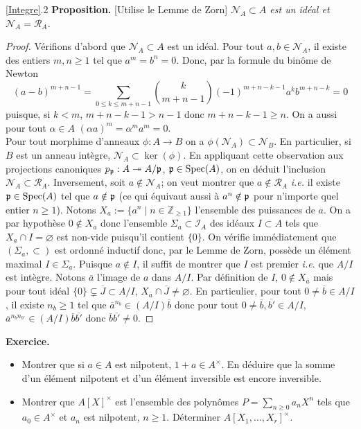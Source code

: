\documentclass[a4paper, oneside, 12pt]{book}
\theoremstyle{theoremeStyle} %
\theoremstyle{definition} %
\newcommand{\ie}{\textit{i.e.}} %
\DeclareMathOperator{\Spec}{Spec}
\newcommand{\Z}{\mathbb{Z}}
\begin{document}
  \ref{Integre}.2 \textbf{Proposition.}  [Utilise le Lemme de Zorn]  \textit{$\mathcal{N}_A\subset A$ est un idéal et $\mathcal{N}_A=\mathcal{R}_A$.}

\begin{proof} Vérifions d'abord que $\mathcal{N}_A\subset A$ est un idéal. Pour tout $a,b \in \mathcal{N}_A$, il existe des entiers $m,n\geq 1$ tel que $a^m=b^n=0$. Donc, par la formule du binôme de Newton $$(a-b)^{m+n-1}=\sum_{0\leq k\leq m+n-1}\binom{k}{m+n-1}(-1)^{m+n-k-1}a^kb^{m+n-k}=0$$
puisque, si $k<m$, $m+n-k-1>n-1$ donc $m+n-k-1\geq n$.  On a aussi pour tout $\alpha\in A$ $(\alpha a)^m=\alpha^m a^m=0$.\\
\indent Pour tout morphime d'anneaux $\phi:A\rightarrow B$ on a $\phi(\mathcal{N}_A)\subset \mathcal{N}_B$. En particulier, si $B$ est un anneau intègre, $\mathcal{N}_A\subset \ker(\phi)$. En appliquant cette observation aux projections canoniques $p_\frak{p}:A\twoheadrightarrow A/\frak{p}$, $\frak{p}\in \Spec(A)$, on en déduit l'inclusion $\mathcal{N}_A\subset \mathcal{R}_A$. Inversement, soit $a\notin \mathcal{N}_A$; on veut montrer que $a\notin \mathcal{R}_A$ \ie{} il existe $\frak{p}\in \Spec(A)$ tel que $a\notin\frak{p}$ (ce qui équivaut aussi à $a^n\notin \frak{p}$ pour n'importe quel entier $n\geq 1$). Notons $X_a:=\lbrace a^n\;|\; n\in \Z_{\geq 1}\rbrace $ l'ensemble des puissances de $a$. On a par hypothèse $0\notin X_a$ donc l'ensemble $\Sigma_a\subset \mathcal{I}_A$ des idéaux $I\subset A$ tels que $X_a\cap I=\varnothing$ est non-vide puisqu'il contient $\lbrace 0\rbrace$. On vérifie immédiatement que $(\Sigma_a,\subset)$ est ordonné inductif donc, par le Lemme de Zorn, possède un élément maximal $I\in \Sigma_a$. Puisque  $a\notin I$, il suffit de montrer que $I$ est premier \ie{} que $A/I$ est intègre. Notons $\overline{a}$  l'image de $a$ dans $A/I$. Par définition de $I$, $0\notin X_{\overline{a}}$ mais  pour tout idéal $\lbrace 0\rbrace\subsetneq \overline{J}\subset A/I$, $X_{\overline{a}}\cap \overline{J}\not=\varnothing$. En particulier, pour tout $0\not=\overline{b}\in A/I$, il existe $n_b\geq 1$ tel que $\overline{a}^{n_b}\in (A/I)\overline{b}$ donc pour tout $0\not=\overline{b}, \overline{b'}\in A/I$, $\overline{a}^{n_bn_{b'}}\in (A/I)\overline{b} \overline{b'}$ donc  $\overline{b} \overline{b'}\not= 0$. \end{proof}

\textbf{Exercice.}
     \begin{itemize}[leftmargin=* ,parsep=0cm,itemsep=0cm,topsep=0cm]
     \item Montrer que si $a\in A$ est nilpotent, $1+a\in A^\times$. En déduire que la somme d'un élément nilpotent et d'un élément inversible est encore inversible.
     \item Montrer que $A[X]^\times$ est l'ensemble des polynômes $P=\sum_{n\geq 0}a_nX^n$ tels que $a_0\in A^\times$ et $a_n$ est nilpotent, $n\geq 1$. Déterminer $A[X_1,\dots, X_r]^\times$. \\
\end{itemize}
\end{document}
